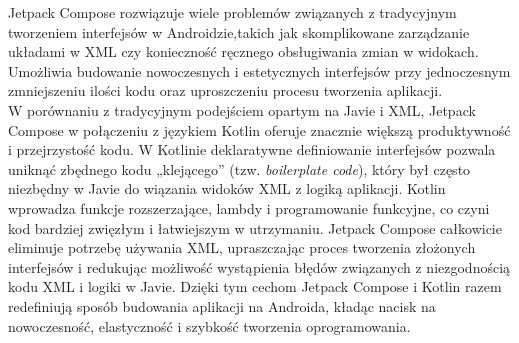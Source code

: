 \documentclass[12pt]{article}
\begin{document}
Jetpack Compose rozwiązuje wiele problemów związanych z tradycyjnym tworzeniem interfejsów w Androidzie,takich jak skomplikowane zarządzanie układami w XML
czy konieczność ręcznego obsługiwania zmian w widokach. Umożliwia budowanie nowoczesnych i estetycznych interfejsów przy jednoczesnym zmniejszeniu ilości kodu
oraz uproszczeniu procesu tworzenia aplikacji.\\
W porównaniu z tradycyjnym podejściem opartym na Javie i XML, Jetpack Compose w połączeniu z językiem Kotlin oferuje znacznie większą produktywność i przejrzystość kodu.
W Kotlinie deklaratywne definiowanie interfejsów pozwala uniknąć zbędnego kodu „klejącego” (tzw. \textit{boilerplate code}), który był często niezbędny w Javie
do wiązania widoków XML z logiką aplikacji. Kotlin wprowadza funkcje rozszerzające, lambdy i programowanie funkcyjne, co czyni kod bardziej zwięzłym i łatwiejszym w utrzymaniu.
Jetpack Compose całkowicie eliminuje potrzebę używania XML, upraszczając proces tworzenia złożonych interfejsów i redukując możliwość wystąpienia błędów związanych
z niezgodnością kodu XML i logiki w Javie. Dzięki tym cechom Jetpack Compose i Kotlin razem redefiniują sposób budowania aplikacji na Androida,
kładąc nacisk na nowoczesność, elastyczność i szybkość tworzenia oprogramowania.
\end{document}
